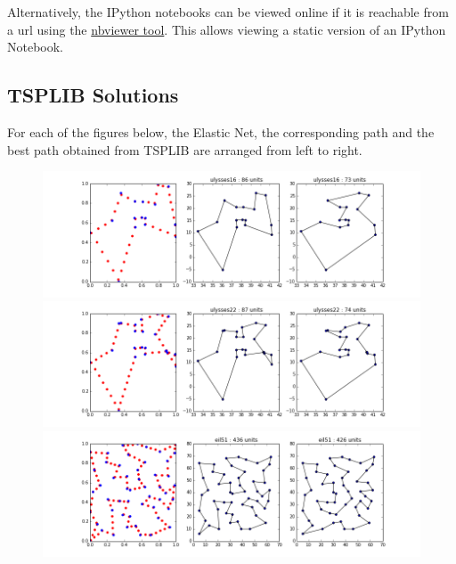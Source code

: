 \documentclass{article} %
\begin{document}
Alternatively, the IPython notebooks can be viewed online if it is reachable from a url using the \href{http://nbviewer.IPython.org/}{nbviewer tool}. This allows viewing a static version of an IPython Notebook.



\subsection{TSPLIB Solutions}
\label{TSPLIB_solutions}
For each of the figures below, the Elastic Net, the corresponding path and the best path obtained from TSPLIB are arranged from left to right.

\begin{figure}[!htb]
\begin{center}
\includegraphics[scale=0.45]{figs/ulysses16}
\includegraphics[scale=0.45]{figs/ulysses22}
\includegraphics[scale=0.45]{figs/eil51}
 \end{center}
\end{figure}
\end{document}
